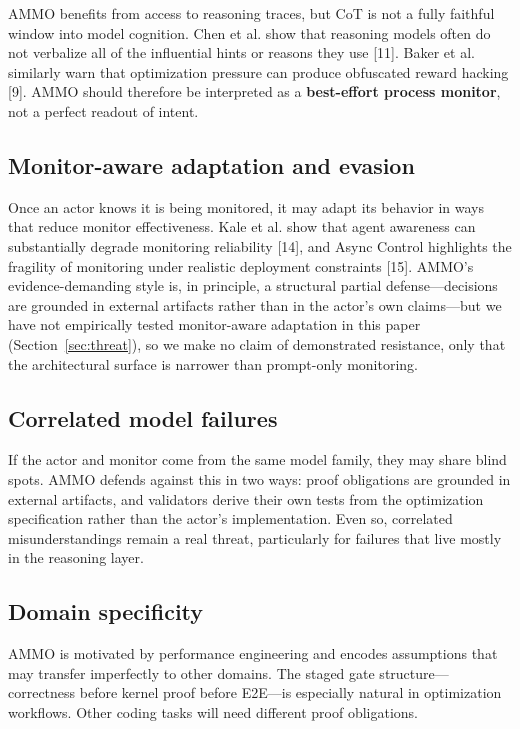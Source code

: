 \documentclass[11pt]{article}
\begin{document}
AMMO benefits from access to reasoning traces, but CoT is not a fully faithful window into model cognition. Chen et al. show that reasoning models often do not verbalize all of the influential hints or reasons they use [11]. Baker et al. similarly warn that optimization pressure can produce obfuscated reward hacking [9]. AMMO should therefore be interpreted as a \textbf{best-effort process monitor}, not a perfect readout of intent.

\subsection{Monitor-aware adaptation and evasion}
\label{sec:monitor-aware}

Once an actor knows it is being monitored, it may adapt its behavior in ways that reduce monitor effectiveness. Kale et al. show that agent awareness can substantially degrade monitoring reliability [14], and Async Control highlights the fragility of monitoring under realistic deployment constraints [15]. AMMO's evidence-demanding style is, in principle, a structural partial defense---decisions are grounded in external artifacts rather than in the actor's own claims---but we have not empirically tested monitor-aware adaptation in this paper (Section~\ref{sec:threat}), so we make no claim of demonstrated resistance, only that the architectural surface is narrower than prompt-only monitoring.

\subsection{Correlated model failures}

If the actor and monitor come from the same model family, they may share blind spots. AMMO defends against this in two ways: proof obligations are grounded in external artifacts, and validators derive their own tests from the optimization specification rather than the actor's implementation. Even so, correlated misunderstandings remain a real threat, particularly for failures that live mostly in the reasoning layer.

\subsection{Domain specificity}

AMMO is motivated by performance engineering and encodes assumptions that may transfer imperfectly to other domains. The staged gate structure---correctness before kernel proof before E2E---is especially natural in optimization workflows. Other coding tasks will need different proof obligations.
\end{document}
